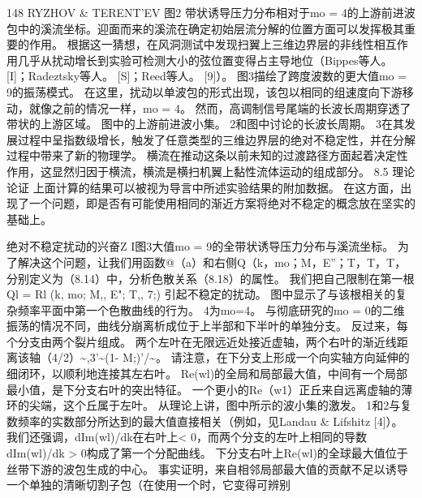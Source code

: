 \documentclass[UTF8,11pt,a4paper,openany,fontset=fandol]{ctexbook}
\begin{document}
148 RYZHOV \& TERENT'EV 图2 带状诱导压力分布相对于mo = 4的上游前进波包中的溪流坐标。迎面而来的溪流在确定初始层流分解的位置方面可以发挥极其重要的作用。 根据这一猜想，在风洞测试中发现扫翼上三维边界层的非线性相互作用几乎从扰动增长到实验可检测大小的弦位置变得占主导地位（Bippes等人。 [I]；Radeztsky等人。 [S]；Reed等人。 [9]）。 图3描绘了跨度波数的更大值mo = 9的振荡模式。 在这里，扰动以单波包的形式出现，该包以相同的组速度向下游移动，就像之前的情况一样，mo = 4。 然而，高调制信号尾端的长波长周期穿透了带状的上游区域。 图中的上游前进波小集。 2和图中讨论的长波长周期。 3在其发展过程中呈指数级增长，触发了任意类型的三维边界层的绝对不稳定性，并在分解过程中带来了新的物理学。 横流在推动这条以前未知的过渡路径方面起着决定性作用，这显然归因于横流，横流是横扫机翼上黏性流体运动的组成部分。 8.5 理论论证 上面计算的结果可以被视为导言中所述实验结果的附加数据。 在这方面，出现了一个问题，即是否有可能使用相同的渐近方案将绝对不稳定的概念放在坚实的基础上。

绝对不稳定扰动的兴奋Z I图3大值mo = 9的全带状诱导压力分布与溪流坐标。 为了解决这个问题，让我们用函数@（a）和右侧Q（k，mo；M，E”；T，T，T，分别定义为（8.14）中，分析色散关系（8.18）的属性。 我们把自己限制在第一根Ql = Rl (k, mo; M,, E"; T,, 7;) 引起不稳定的扰动。 图中显示了与该根相关的复杂频率平面中第一个色散曲线的行为。 4为mo=4。 与彻底研究的mo = 0的二维振荡的情况不同，曲线分崩离析成位于上半部和下半叶的单独分支。 反过来，每个分支由两个裂片组成。 两个左叶在无限远近处接近虚轴，两个右叶的渐近线距离该轴（4/2）\textasciitilde{},3'\textasciitilde{}(1- M;)'/\textasciitilde{}。 请注意，在下分支上形成一个向实轴方向延伸的细闭环，以顺利地连接其左右叶。 Re(wl)的全局和局部最大值，中间有一个局部最小值，是下分支右叶的突出特征。 一个更小的Re（w1）正丘来自远离虚轴的薄环的尖端，这个丘属于左叶。 从理论上讲，图中所示的波小集的激发。 1和2与复数频率的实数部分所达到的最大值直接相关（例如，见Landau \& Lifshitz [4]）。 我们还强调，dIm(wl)/dk在右叶上< 0，而两个分支的左叶上相同的导数dIm(wl)/dk > 0构成了第一个分配曲线。 下分支右叶上Re(wl)的全球最大值位于丝带下游的波包生成的中心。 事实证明，来自相邻局部最大值的贡献不足以诱导一个单独的清晰切割子包（在使用一个时，它变得可辨别
\end{document}
